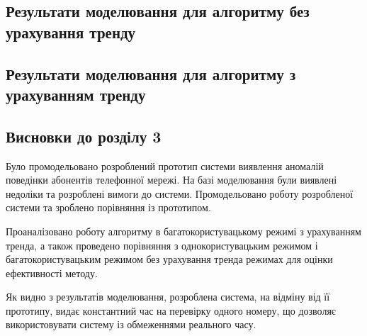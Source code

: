 
\subsection{Результати моделювання для алгоритму без урахування тренду}
    \TBD
\subsection{Результати моделювання для алгоритму з урахуванням тренду}
    \TBD
\subsection*{Висновки до розділу 3}

Було промодельовано розроблений прототип системи виявлення аномалій поведінки абонентів телефонної мережі. На базі моделювання були виявлені недоліки та розроблені вимоги до системи. Промодельовано роботу розробленої системи та зроблено порівняння із прототипом.

Проаналізовано роботу алгоритму в багатокористувацькому режимі з урахуванням тренда, а також проведено порівняння з однокористувацьким режимом і багатокористувацьким режимом без урахування тренда режимах для оцінки ефективності методу.

Як видно з результатів моделювання, розроблена система, на відміну від її прототипу, видає константний час на перевірку одного номеру, що дозволяє використовувати систему із обмеженнями реального часу.
